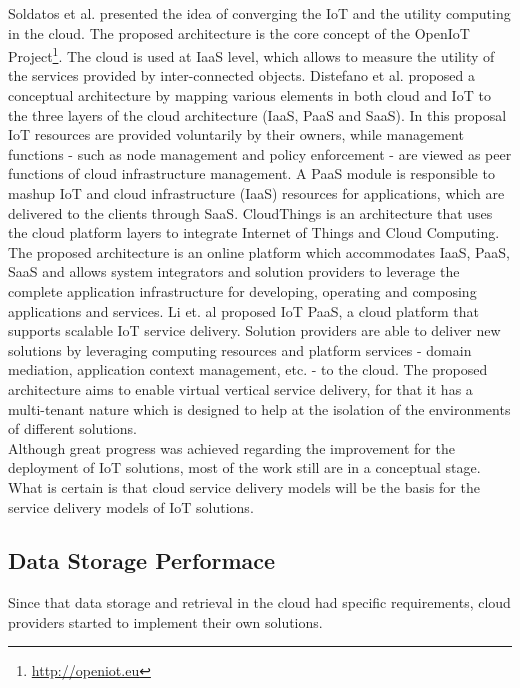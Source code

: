 Soldatos et al. \cite{soldatos2012convergence} presented the idea of converging the IoT
and the utility computing in the cloud. The proposed architecture is the core concept of the OpenIoT
Project\footnote{\url{http://openiot.eu}}. The cloud is used at \gls{IaaS} level, which allows
to measure the utility of the services provided by inter-connected objects.
Distefano et al. \cite{distefano2012enabling} proposed a conceptual architecture by
mapping various elements in both cloud and IoT to the three layers of the cloud architecture (\gls{IaaS},
\gls{PaaS} and \gls{SaaS}). In this proposal IoT resources are provided voluntarily by their owners,
while management functions - such as node management and policy enforcement - are viewed as peer
functions of cloud infrastructure management. A \gls{PaaS} module is responsible to mashup IoT and
cloud infrastructure (\gls{IaaS}) resources for applications, which are delivered to the clients
through \gls{SaaS}.
CloudThings \cite{zhou2013cloudthings} is an architecture that uses the cloud platform layers to
integrate Internet of Things and Cloud Computing. The proposed architecture is an online platform
which accommodates \gls{IaaS}, \gls{PaaS}, \gls{SaaS} and allows system integrators and solution
providers to leverage the complete application infrastructure for developing, operating and composing
applications and services.
Li et. al \cite{li2013efficient} proposed IoT PaaS, a cloud platform that supports
scalable IoT service delivery. Solution providers are able to deliver new solutions by leveraging
computing resources and platform services - domain mediation, application context management, etc.
- to the cloud. The proposed architecture aims to enable virtual vertical service delivery, for that
it has a multi-tenant nature which is designed to help at the isolation of the environments of
different solutions.\\

Although great progress was achieved regarding the improvement for the deployment of \gls{IoT}
solutions, most of the work still are in a conceptual stage. What is certain is that cloud service
delivery models will be the basis for the service delivery models of \gls{IoT} solutions.

\subsection{Data Storage Performace}
\label{sub:data_storage}
Since that data storage and retrieval in the cloud had specific requirements, cloud providers started
to implement their own solutions.

